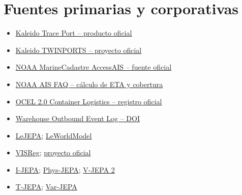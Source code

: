 \documentclass[11pt,a4paper]{article}
\begin{document}
\section*{Fuentes primarias y corporativas}
\begin{itemize}\small
\item \href{https://www.kaleidologistics.com/en/productos-ktech/trace-port/}{Kaleido Trace Port -- producto oficial}
\item \href{https://www.kaleidologistics.com/es/proyectos-financiados/el-proyecto-twinports-despega-en-el-puerto-de-vigo-comienzan-los-trabajos-para-crear-el-gemelo-digital-de-la-terminal-portuaria-de-kaleido/}{Kaleido TWINPORTS -- proyecto oficial}
\item \href{https://coast.noaa.gov/digitalcoast/tools/ais.html}{NOAA MarineCadastre AccessAIS -- fuente oficial}
\item \href{https://coast.noaa.gov/data/marinecadastre/ais/faq.pdf}{NOAA AIS FAQ -- cálculo de ETA y cobertura}
\item \href{https://doi.org/10.5281/zenodo.18373888}{OCEL 2.0 Container Logistics -- registro oficial}
\item \href{https://doi.org/10.6084/m9.figshare.29500898}{Warehouse Outbound Event Log -- DOI}
\item \href{https://arxiv.org/abs/2511.08544}{LeJEPA}; \href{https://arxiv.org/abs/2603.19312}{LeWorldModel}
\item \href{https://arxiv.org/abs/2606.02572}{VISReg}; \href{https://haiyuwu.github.io/visreg/}{proyecto oficial}
\item \href{https://arxiv.org/abs/2301.08243}{I-JEPA}; \href{https://arxiv.org/abs/2606.16076}{Phys-JEPA}; \href{https://arxiv.org/abs/2506.09985}{V-JEPA 2}
\item \href{https://arxiv.org/abs/2410.05016}{T-JEPA}; \href{https://arxiv.org/abs/2603.20111}{Var-JEPA}
\end{itemize}
\end{document}
